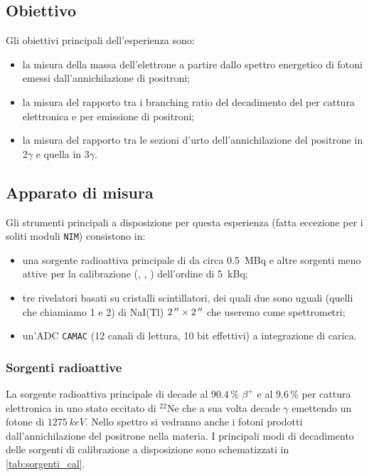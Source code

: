 \subsection{Obiettivo}
Gli obiettivi principali dell'esperienza sono:
\begin{itemize}
	\item la misura della massa dell'elettrone a partire dallo spettro energetico di fotoni emessi dall'annichilazione di positroni;
	\item la misura del rapporto tra i branching ratio del decadimento del  \na{} per cattura elettronica e per emissione di positroni;
	\item la misura del rapporto tra le sezioni d'urto dell'annichilazione del positrone in $2\gamma$ e quella in $3\gamma$.
\end{itemize}

\subsection{Apparato di misura}
Gli strumenti principali a disposizione per questa esperienza (fatta eccezione per i soliti moduli \texttt{NIM}) consistono in:
\begin{itemize}
	\item una sorgente radioattiva principale di \na{} da circa \SI{0.5}{MBq}
	e altre sorgenti meno attive per la calibrazione (\na, \cs, \co) dell'ordine di \SI{5}{kBq};
	\item tre rivelatori basati su cristalli scintillatori,
	dei quali due sono uguali (quelli che chiamiamo 1 e 2) di NaI(Tl) $\SI2{''}\times\SI2{''}$
	che useremo come spettrometri;
	\item un'ADC \texttt{CAMAC} (12 canali di lettura, 10 bit effettivi) a integrazione di carica.
\end{itemize}

\subsubsection{Sorgenti radioattive}

La sorgente radioattiva principale di \na{} decade al $90.4\,\%$ $\beta^+$ e al $9.6\,\%$ per cattura elettronica in uno stato eccitato di $^{22}$Ne che a sua volta decade $\gamma$ emettendo un fotone di $\SI{1275}{keV}$. Nello spettro si vedranno anche i fotoni prodotti dall'annichilazione del positrone nella materia.
I principali modi di decadimento delle sorgenti di calibrazione a disposizione sono schematizzati in \autoref{tab:sorgenti_cal}.

